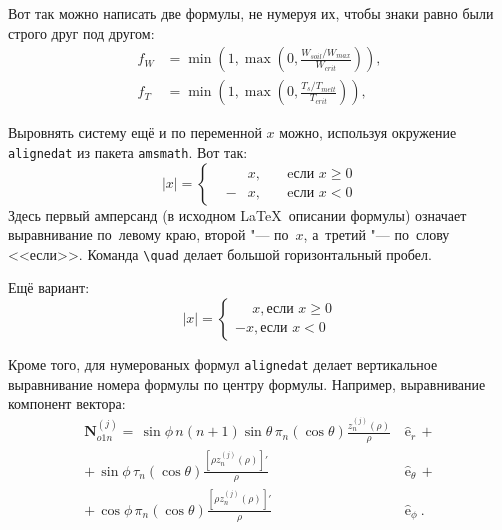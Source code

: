 Вот так можно написать две формулы, не нумеруя их, чтобы знаки равно были строго друг под другом:
\begin{align}
  f_W & =  \min \left( 1, \max \left( 0, \frac{W_{soil} / W_{max}}{W_{crit}} \right)  \right), \nonumber \\
  f_T & =  \min \left( 1, \max \left( 0, \frac{T_s / T_{melt}}{T_{crit}} \right)  \right), \nonumber
\end{align}

Выровнять систему ещё и по переменной $ x $ можно, используя окружение \verb|alignedat| из пакета \verb|amsmath|. Вот так:
\[
    |x| = \left\{
    \begin{alignedat}{2}
        &&x, \quad &\text{eсли } x\geqslant 0 \\
        &-&x, \quad & \text{eсли } x<0
    \end{alignedat}
    \right.
\]
Здесь первый амперсанд (в исходном \LaTeX\ описании формулы) означает выравнивание по~левому краю,
второй "--- по~$ x $, а~третий "--- по~слову <<если>>. Команда \verb|\quad| делает большой горизонтальный пробел.

Ещё вариант:
\[
    |x|=
    \begin{cases}
    \phantom{-}x, \text{если } x \geqslant 0 \\
    -x, \text{если } x<0
    \end{cases}
\]

Кроме того, для  нумерованых формул \verb|alignedat|  делает вертикальное
выравнивание номера формулы по центру формулы. Например,  выравнивание компонент вектора:
\begin{equation}
 \label{eq:2p3}
 \begin{alignedat}{2}
{\mathbf{N}}_{o1n}^{(j)} = \,{\sin} \phi\,n\!\left(n+1\right)
         {\sin}\theta\,
         \pi_n\!\left({\cos} \theta\right)
         \frac{
               z_n^{(j)}\!\left( \rho \right)
              }{\rho}\,
           &{\boldsymbol{\hat{\mathrm e}}}_{r}\,+   \\
+\,
{\sin} \phi\,
         \tau_n\!\left({\cos} \theta\right)
         \frac{
            \left[\rho z_n^{(j)}\!\left( \rho \right)\right]'
              }{\rho}\,
            &{\boldsymbol{\hat{\mathrm e}}}_{\theta}\,+   \\
+\,
{\cos} \phi\,
         \pi_n\!\left({\cos} \theta\right)
         \frac{
            \left[\rho z_n^{(j)}\!\left( \rho \right)\right]'
              }{\rho}\,
            &{\boldsymbol{\hat{\mathrm e}}}_{\phi}\:.
\end{alignedat}
\end{equation}


